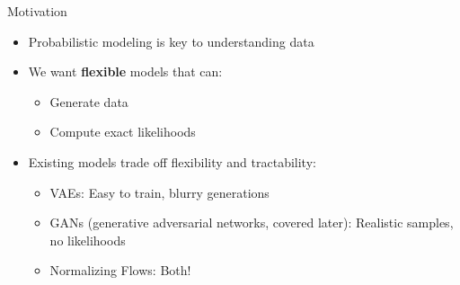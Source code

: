 \begin{frame}[allowframebreaks]{}
    \begin{figure}
        \centering
    \end{figure}
\end{frame}

\begin{frame}{Motivation}
    \begin{itemize}
        \item Probabilistic modeling is key to understanding data
        \item We want \textbf{flexible} models that can:
        \begin{itemize}
            \item Generate data
            \item Compute exact likelihoods
        \end{itemize}
        \item Existing models trade off flexibility and tractability:
        \begin{itemize}
            \item VAEs: Easy to train, blurry generations
            \item GANs (generative adversarial networks, covered later): Realistic samples, no likelihoods
            \item Normalizing Flows: Both!
        \end{itemize}
    \end{itemize}
\end{frame}